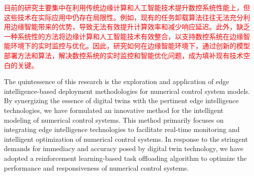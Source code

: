 \documentclass[preprint,12pt]{elsarticle}
\begin{document}
\textcolor{red}{目前的研究主要集中在利用传统边缘计算和人工智能技术提升数控系统性能上，但这些技术在实际应用中仍存在局限性。例如，现有的任务卸载算法往往无法充分利用边缘智能带来的优势，导致无法有效提升计算效率和减少响应延迟。此外，缺乏一种系统性的方法将边缘计算和人工智能技术有效整合，以支持数控系统在边缘智能环境下的实时监控与优化。因此，研究如何在边缘智能环境下，通过创新的模型部署方法和算法，解决数控系统的实时监控和智能优化问题，成为填补现有技术空白的关键。}

The quintessence of this research is the exploration and application of edge intelligence-based deployment methodologies for numerical control system models. By synergizing the essence of digital twins with the pertinent edge intelligence technologies, we have formulated an innovative method for the intelligent modeling of numerical control systems. This method primarily focuses on integrating edge intelligence technologies to facilitate real-time monitoring and intelligent optimization of numerical control systems. In response to the stringent demands for immediacy and accuracy posed by digital twin technology, we have adopted a reinforcement learning-based task offloading algorithm to optimize the performance and responsiveness of numerical control systems.
\end{document}
